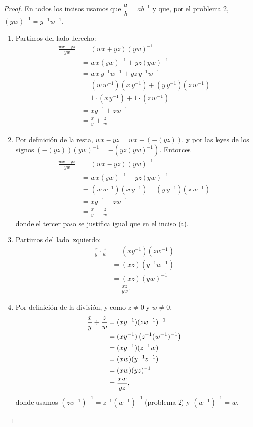 \documentclass[12pt,a4paper]{article}
\begin{document}
    \begin{proof}
        En todos los incisos usamos que $\dfrac{a}{b}=ab^{-1}$ y que, por el problema 2, $(yw)^{-1}=y^{-1}w^{-1}$.
        \begin{enumerate}
            \item[(a)] Partimos del lado derecho:
            \begin{align*}
                \frac{wx+yz}{yw}&=(wx+yz)(yw)^{-1}\\
                &=wx(yw)^{-1}+yz(yw)^{-1}\\
                &=wx\,y^{-1}w^{-1}+yz\,y^{-1}w^{-1}\\
                &=(w\,w^{-1})(x\,y^{-1})+(y\,y^{-1})(z\,w^{-1})\\
                &=1\cdot(x\,y^{-1})+1\cdot(z\,w^{-1})\\
                &=xy^{-1}+zw^{-1}\\
                &=\frac{x}{y}+\frac{z}{w}.
            \end{align*}
            \item[(b)] Por definición de la resta, $wx-yz=wx+(-(yz))$, y por las leyes de los signos $(-(yz))(yw)^{-1}=-\left(yz(yw)^{-1}\right)$. Entonces
            \begin{align*}
                \frac{wx-yz}{yw}&=(wx-yz)(yw)^{-1}\\
                &=wx(yw)^{-1}-yz(yw)^{-1}\\
                &=(w\,w^{-1})(x\,y^{-1})-(y\,y^{-1})(z\,w^{-1})\\
                &=xy^{-1}-zw^{-1}\\
                &=\frac{x}{y}-\frac{z}{w},
            \end{align*}
            donde el tercer paso se justifica igual que en el inciso (a).
            \item[(c)] Partimos del lado izquierdo:
            \begin{align*}
                \frac{x}{y}\cdot\frac{z}{w}&=(xy^{-1})(zw^{-1})\\
                &=(xz)(y^{-1}w^{-1})\\
                &=(xz)(yw)^{-1}\\
                &=\frac{xz}{yw}.
            \end{align*}
            \item[(d)] Por definición de la división, y como $z\neq0$ y $w\neq0$,
            \begin{align*}
                \frac{x}{y}\mathbin{\divisionsymbol}\frac{z}{w}&=(xy^{-1})(zw^{-1})^{-1}\\
                &=(xy^{-1})\left(z^{-1}(w^{-1})^{-1}\right)\\
                &=(xy^{-1})(z^{-1}w)\\
                &=(xw)(y^{-1}z^{-1})\\
                &=(xw)(yz)^{-1}\\
                &=\frac{xw}{yz},
            \end{align*}
            donde usamos $(zw^{-1})^{-1}=z^{-1}(w^{-1})^{-1}$ (problema 2) y $(w^{-1})^{-1}=w$.
        \end{enumerate}
    \end{proof}
\end{document}
